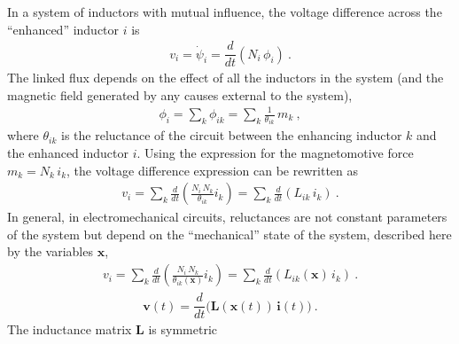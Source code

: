 \documentclass[letterpaper,10pt,english]{jupyterBook}
\begin{document}
\sphinxAtStartPar
In a system of inductors with mutual influence, the voltage difference across the “enhanced” inductor \(i\) is
\begin{equation*}
\begin{split}v_i = \dot{\psi}_i = \dfrac{d}{dt} \left( N_i \, \phi_i \right) \ .\end{split}
\end{equation*}
\sphinxAtStartPar
The linked flux depends on the effect of all the inductors in the system (and the magnetic field generated by any causes external to the system),
\begin{equation*}
\begin{split}\phi_i = \sum_{k} \phi_{ik} = \sum_{k} \frac{1}{\theta_{ik}} \, m_k \ ,\end{split}
\end{equation*}
\sphinxAtStartPar
where \(\theta_{ik}\) is the reluctance of the circuit between the enhancing inductor \(k\) and the enhanced inductor \(i\). Using the expression for the magnetomotive force \(m_k = N_k \, i_k\), the voltage difference expression can be rewritten as
\begin{equation*}
\begin{split}v_i = \sum_k \frac{d}{dt} \left( \frac{N_i \, N_k}{\theta_{ik}} i_k \right) = \sum_k \frac{d}{dt} \left( L_{ik} \, i_k \right) \ .\end{split}
\end{equation*}
\sphinxAtStartPar
In general, in electromechanical circuits, reluctances are not constant parameters of the system but depend on the “mechanical” state of the system, described here by the variables \(\mathbf{x}\),
\begin{equation*}
\begin{split}v_i = \sum_k \frac{d}{dt} \left( \frac{N_i \, N_k}{\theta_{ik}(\mathbf{x})} i_k \right) = \sum_k \frac{d}{dt} \left( L_{ik} (\mathbf{x}) \, i_k \right) \ .\end{split}
\end{equation*}\begin{equation*}
\begin{split}\mathbf{v}(t) = \dfrac{d}{dt} \Big( \mathbf{L}(\mathbf{x}(t)) \, \mathbf{i}(t) \Big) \ .\end{split}
\end{equation*}
\sphinxAtStartPar
The inductance matrix \(\mathbf{L}\) is symmetric  
\label{ch/circuits-electromechanic:example-0}
\end{document}
